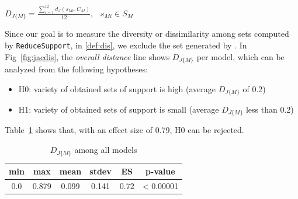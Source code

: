 \begin{definition}
  \label{def:dis}
  $D_{J\{M\}} =  \frac{\sum_{i=1}^{12}d_J(s_{Mi}, C_M)}{12},   \hspace{9pt} s_{Mi} \in S_M$
\end{definition}

Since our goal is to measure the diversity or dissimilarity among sets computed by \texttt{ReduceSupport}, in \ref{def:dis}, we exclude the set generated by \ucbfalg . In Fig~\ref{fig:jacdis}, the \emph{overall distance} line shows $D_{J\{M\}}$ per model, which can be analyzed from the following hypotheses:
\begin{itemize}
  \item H0: variety of obtained sets of support is high (average $D_{J\{M\}}$ of 0.2)
  \item H1: variety of obtained sets of support is small (average $D_{J\{M\}}$ less than 0.2)
\end{itemize}
Table~\ref{tab:variety} shows that, with an effect size of 0.79, H0 can be rejected.
\begin{table}
  \caption{$D_{J\{M\}}$ among all models}
  \centering
  \begin{tabular}{ |c|c|c|c|c|c| }
    \hline
     min & max & mean & stdev & ES & p-value\\[0.5ex]
    \hline
     0.0   & 0.879 & 0.099 & 0.141 & 0.72 & < 0.00001 \\[0.5ex]
    \hline
  \end{tabular}
  \label{tab:variety}
\end{table}
\fi



